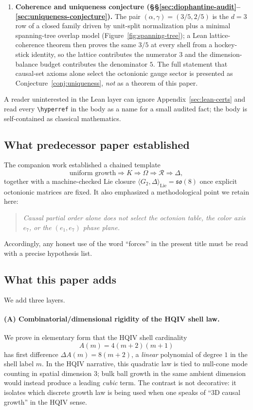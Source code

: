 \documentclass[11pt]{amsart}
\begin{document}
\begin{enumerate}
  \item \textbf{Coherence and uniqueness conjecture (\S\S\ref{sec:diophantine-audit}--\ref{sec:uniqueness-conjecture}).} The pair \((\alpha,\gamma)=(3/5,2/5)\) is the \(d=3\) row of a closed family driven by unit-split normalization plus a minimal spanning-tree overlap model (Figure~\ref{fig:spanning-tree}); a Lean lattice-coherence theorem then proves the same \(3/5\) at every shell from a hockey-stick identity, so the lattice contributes the numerator \(3\) and the dimension-balance budget contributes the denominator \(5\). The full statement that causal-set axioms alone select the octonionic gauge sector is presented as Conjecture~\ref{conj:uniqueness}, \emph{not} as a theorem of this paper.
\end{enumerate}

\noindent A reader uninterested in the Lean layer can ignore Appendix~\ref{sec:lean-certs} and read every \verb|\hyperref| in the body as a name for a small audited fact; the body is self-contained as classical mathematics.

\subsection{What predecessor paper established}
\label{subsec:predecessor}

The companion work \cite{hqiv-so8-paper} established a chained template
\[
\text{uniform growth}\Longrightarrow K\Longrightarrow \Omega\Longrightarrow \mathcal{R}
\Longrightarrow \Delta,
\]
together with a machine-checked Lie closure \(\langle G_2,\Delta\rangle_{\mathrm{Lie}}=\mathfrak{so}(8)\) once explicit octonionic matrices are fixed. It also emphasized a methodological point we retain here:
\begin{quote}
\emph{Causal partial order alone does not select the octonion table, the color axis \(e_7\), or the \((e_1,e_7)\) phase plane.}
\end{quote}
Accordingly, any honest use of the word ``forces'' in the present title must be read with a precise hypothesis list.

\subsection{What this paper adds}

We add three layers.

\paragraph{(A) Combinatorial/dimensional rigidity of the HQIV shell law.}
We prove in elementary form that the HQIV shell cardinality
\[
A(m)=4(m+2)(m+1)
\]
has first difference \(\Delta A(m)=8(m+2)\), a \emph{linear} polynomial of degree \(1\) in the shell label \(m\). In the HQIV narrative, this quadratic law is tied to null-cone mode counting in spatial dimension \(3\); bulk ball growth in the same ambient dimension would instead produce a leading \emph{cubic} term. The contrast is not decorative: it isolates which discrete growth law is being used when one speaks of ``\(3\)D causal growth'' in the HQIV sense.
\end{document}
